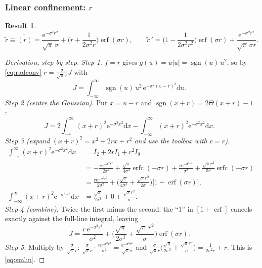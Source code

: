\documentclass[11pt,a4paper]{article}
\numberwithin{equation}{section}
\theoremstyle{definition}
\theoremstyle{plain}
\newtheorem{result}[definition]{Result}
\theoremstyle{remark}
\numberwithin{algorithm}{section}
\newcommand{\dd}{\mathrm{d}}
\newcommand{\ee}{\mathrm{e}}
\newcommand{\erf}{\operatorname{erf}}
\newcommand{\erfc}{\operatorname{erfc}}
\newcommand{\sgn}{\operatorname{sgn}}
\begin{document}
\subsubsection{\texorpdfstring{Linear confinement: $r$}{Linear confinement: r}}\label{sec:smlin}
\begin{result}
\begin{equation}
\tilde r\equiv\widetilde{(r)}=\frac{\ee^{-\sigma^2r^2}}{\sqrt\pi\,\sigma}+\Big(r+\frac1{2\sigma^2r}\Big)\erf(\sigma r),\qquad
\tilde r\,'=\Big(1-\frac1{2\sigma^2r^2}\Big)\erf(\sigma r)+\frac{\ee^{-\sigma^2r^2}}{\sqrt\pi\,\sigma r}.
\label{eq:smlin}
\end{equation}
\end{result}
\begin{proof}[Derivation, step by step]
\emph{Step 1.} $f=r$ gives $g(u)=u|u|=\sgn(u)\,u^2$, so by \eqref{eq:radconv} $\tilde r=\frac{\sigma}{\sqrt\pi\,r}J$ with
\begin{equation*}
J=\int_{-\infty}^\infty\sgn(u)\,u^2\,\ee^{-\sigma^2(u-r)^2}\dd u .
\end{equation*}
\emph{Step 2 (centre the Gaussian).} Put $x=u-r$ and $\sgn(x+r)=2\Theta(x+r)-1$:
\begin{equation*}
J=2\int_{-r}^\infty(x+r)^2\ee^{-\sigma^2x^2}\dd x-\int_{-\infty}^\infty(x+r)^2\ee^{-\sigma^2x^2}\dd x .
\end{equation*}
\emph{Step 3 (expand $(x+r)^2=x^2+2rx+r^2$ and use the toolbox with $c=r$).}
\begin{align*}
\int_{-r}^\infty(x+r)^2\ee^{-\sigma^2x^2}\dd x&=I_2+2rI_1+r^2I_0\\
&=-\frac{r\ee^{-\sigma^2r^2}}{2\sigma^2}+\frac{\sqrt\pi}{4\sigma^3}\erfc(-\sigma r)+\frac{r\ee^{-\sigma^2r^2}}{\sigma^2}+\frac{\sqrt\pi r^2}{2\sigma}\erfc(-\sigma r)\\
&=\frac{r\ee^{-\sigma^2r^2}}{2\sigma^2}+\Big(\frac{\sqrt\pi}{4\sigma^3}+\frac{\sqrt\pi r^2}{2\sigma}\Big)\big[1+\erf(\sigma r)\big],\\
\int_{-\infty}^\infty(x+r)^2\ee^{-\sigma^2x^2}\dd x&=\frac{\sqrt\pi}{2\sigma^3}+0+\frac{\sqrt\pi r^2}{\sigma}.
\end{align*}
\emph{Step 4 (combine).} Twice the first minus the second: the ``$1$'' in $[1+\erf]$ cancels exactly against the full-line integral, leaving
\begin{equation*}
J=\frac{r\,\ee^{-\sigma^2r^2}}{\sigma^2}+\Big(\frac{\sqrt\pi}{2\sigma^3}+\frac{\sqrt\pi\,r^2}{\sigma}\Big)\erf(\sigma r).
\end{equation*}
\emph{Step 5.} Multiply by $\frac{\sigma}{\sqrt\pi r}$: $\frac{\sigma}{\sqrt\pi r}\cdot\frac{r\ee^{-\sigma^2r^2}}{\sigma^2}=\frac{\ee^{-\sigma^2r^2}}{\sqrt\pi\sigma}$ and $\frac{\sigma}{\sqrt\pi r}\big(\frac{\sqrt\pi}{2\sigma^3}+\frac{\sqrt\pi r^2}{\sigma}\big)=\frac{1}{2\sigma^2r}+r$. This is \eqref{eq:smlin}.


\end{proof}
\end{document}
